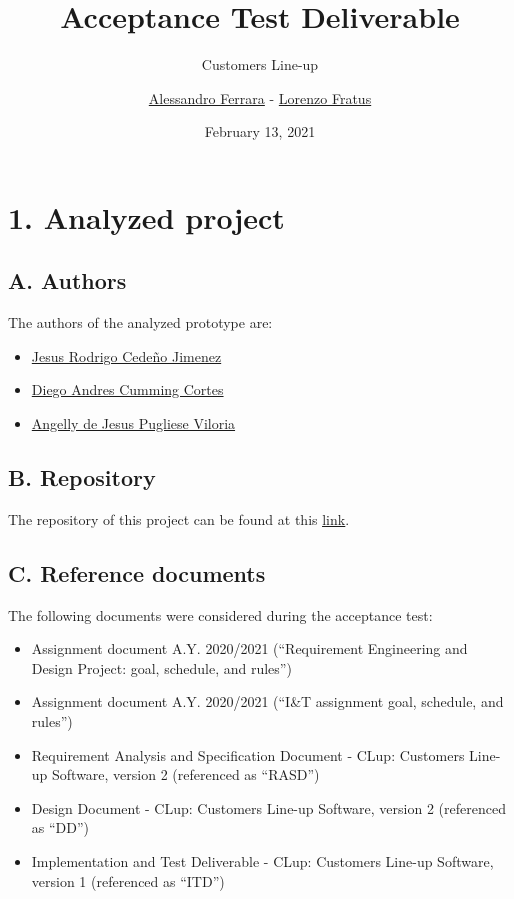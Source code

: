 
\graphicspath{ {assets/} }
\usepackage{dirtree}

\title{Acceptance Test Deliverable}
\subtitle{Customers Line-up}
\author{\href{https://github.com/ferrohd}{Alessandro Ferrara} -
\href{https://github.com/lorenzofratus}{Lorenzo Fratus}}
\date{February 13, 2021}



\maketitle

\tableofcontents

\chapter{1. Analyzed project}

\section{A. Authors}

The authors of the analyzed prototype are:
\begin{itemize}
    \item \href{https://github.com/rodrigocedeno}{Jesus Rodrigo Cedeño Jimenez}
    \item \href{https://github.com/dacumming}{Diego Andres Cumming Cortes}
    \item \href{https://github.com/anpugliese}{Angelly de Jesus Pugliese Viloria}
\end{itemize}

\section{B. Repository}

The repository of this project can be found at this \underline{\href{https://github.com/anpugliese/CedenoCummingPugliese}{link}}.

\section{C. Reference documents}

The following documents were considered during the acceptance test:
\begin{itemize}
\item
  Assignment document A.Y. 2020/2021 (``Requirement Engineering and Design Project: goal, schedule, and rules'')
\item
  Assignment document A.Y. 2020/2021 (``I\&T assignment goal, schedule, and rules'')
\item
  Requirement Analysis and Specification Document - CLup: Customers Line-up Software, version 2 (referenced as ``RASD'')
\item
  Design Document - CLup: Customers Line-up Software, version 2 (referenced as ``DD'')
\item
  Implementation and Test Deliverable - CLup: Customers Line-up Software, version 1 (referenced as ``ITD'')
\end{itemize}

